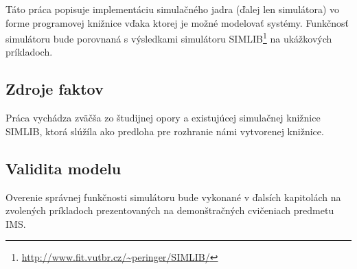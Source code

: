 \documentclass[11pt, a4paper, titlepage]{article}
\begin{document}
Táto práca popisuje implementáciu simulačného jadra (ďalej len simulátora) vo forme programovej knižnice vďaka ktorej je možné modelovať  systémy. Funkčnosť simulátoru bude porovnaná s výsledkami simulátoru SIMLIB\footnote{\url{http://www.fit.vutbr.cz/~peringer/SIMLIB/}} na ukážkových príkladoch.
%
%
%

\subsection{Zdroje faktov}
Práca vychádza zväčša zo študijnej opory\cite{opora} a existujúcej simulačnej knižnice SIMLIB, ktorá slúžíla ako predloha pre rozhranie námi vytvorenej knižnice.

\subsection{Validita modelu}
Overenie správnej funkčnosti simulátoru bude vykonané v ďalsích kapitolách na zvolených príkladoch prezentovaných na demonštračných cvičeniach predmetu IMS.
\end{document}
